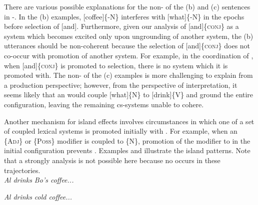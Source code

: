   There are various possible explanations for the non- of the (b) and (c) sentences in -. In the (b) examples, [coffee]\{-N\} interferes with [what]\{-N\} in the epochs before selection of [and]. Furthermore, given our analysis of [and]\{\textsc{conj}\} as a system which becomes excited only upon ungrounding of another system, the (b) utterances should be non-coherent because the selection of [and]\{\textsc{conj}\} does not co-occur with promotion of another system. For example, in the  coordination of , when [and]\{\textsc{conj}\} is promoted to selection, there is no system which it is promoted with. The non- of the (c) examples is more challenging to explain from a production perspective; however, from the perspective of interpretation, it seems likely that an  would couple [what]\{N\} to [drink]\{V\} and ground the entire configuration, leaving the remaining cs-systems unable to cohere.

Another mechanism for island effects involves circumstances in which one of a set of coupled lexical systems is promoted initially with . For example, when an \{A\textsc{dj}\} or \{P\textsc{oss}\} modifier is coupled to \{N\}, promotion of the modifier to  in the initial configuration prevents . Examples  and  illustrate the island patterns. Note that a strongly  analysis is not possible here because no  occurs in these trajectories.\\

\noindent \textit{Al drinks Bo's coffee...}
\label{ex:7:25}
    \label{ex:7:25a}
    \label{ex:7:25b}
\z
\z

\label{ex:7:26}
    \label{ex:7:26a}
    \label{ex:7:26b}
\z
\z

\noindent \textit{Al drinks cold coffee...}
\label{ex:7:27}
    \label{ex:7:27a}
    \label{ex:7:27b}
\z
\z

\label{ex:7:28}
    \label{ex:7:28a}
    \label{ex:7:28b}
\z
\z


